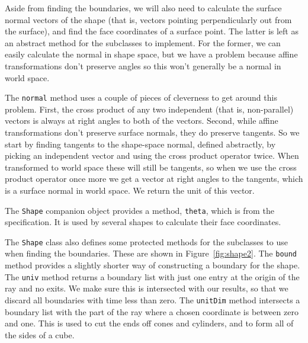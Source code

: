 Aside from finding the boundaries,
we will also need to calculate the surface normal vectors of the shape
(that is, vectors pointing perpendicularly out from the surface),
and find the face coordinates of a surface point.
The latter is left as an abstract method for the subclasses to implement.
For the former, we can easily calculate the normal in shape space,
but we have a problem because affine transformations don't preserve angles
so this won't generally be a normal in world space.

The \verb!normal! method uses a couple of pieces of cleverness
to get around this problem.
First,
the cross product of any two independent (that is, non-parallel) vectors
is always at right angles to both of the vectors.
Second, while affine transformations don't preserve surface normals,
they do preserve tangents.
So we start by finding tangents to the shape-space normal,
defined abstractly,
by picking an independent vector and using the cross product operator twice.
When transformed to world space these will still be tangents,
so when we use the cross product operator once more
we get a vector at right angles to the tangents,
which is a surface normal in world space.
We return the unit of this vector.

The \verb!Shape! companion object provides a method, \verb!theta!,
which is from the specification.
It is used by several shapes to calculate their face coordinates.

The \verb!Shape! class also defines some protected methods
for the subclasses to use when finding the boundaries.
These are shown in Figure~\ref{fig:shape2}.
The \verb!bound! method provides a slightly shorter way of
constructing a boundary for the shape.
The \verb!univ! method returns a boundary list with
just one entry at the origin of the ray and no exits.
We make sure this is intersected with our results,
so that we discard all boundaries with time less than zero.
The \verb!unitDim! method intersects a boundary list with
the part of the ray where a chosen coordinate is between zero and one.
This is used to cut the ends off cones and cylinders,
and to form all of the sides of a cube.

